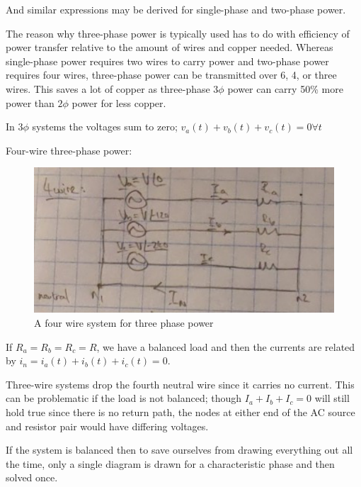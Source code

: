 \documentclass[../notes.tex]{subfiles}
\begin{document}
And similar expressions may be derived for single-phase and two-phase power.


The reason why three-phase power is typically used has to do with efficiency of power transfer relative to the amount of wires and copper needed.
Whereas single-phase power requires two wires to carry power and two-phase power requires four wires, three-phase power can be transmitted over 6, 4, or three wires.
This saves a lot of copper as three-phase $ 3\phi $ power can carry 50\% more power than $ 2\phi $ power for less copper.



In $ 3\phi $ systems the voltages sum to zero; $ v_a(t) + v_b(t) + v_c(t) = 0 \forall t$ 

Four-wire three-phase power:


\begin{figure}[H]
	\centering
	\includegraphics[width=0.8\linewidth]{img/image_2022-09-18-02-19-51.png}
	\caption{A four wire system for three phase power}
\end{figure}

If $ R_a = R_b = R_c = R $, we have a balanced load and then the currents are related by $ i_n = i_a(t) + i_b(t) + i_c(t) = 0 $.


Three-wire systems drop the fourth neutral wire since it carries no current. This can be problematic if the load is not balanced; though $ I_a + I_b + I_c = 0$  will still hold true since there is no return path, the nodes at either end of the AC source and resistor pair would have differing voltages.


If the system is balanced then to save ourselves from drawing everything out all the time, only a single diagram is drawn for a characteristic phase and then solved once.
\end{document}
